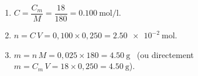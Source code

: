 \documentclass[11pt,a4paper]{article}
\begin{document}
\begin{corrige}
\begin{enumerate}[label=\alph*)]
  \item $C = \dfrac{C_m}{M} = \dfrac{18}{180} = \SI{0.100}{\mole\per\litre}$.
  \item $n = C\,V = 0{,}100\times 0{,}250 = \SI{2.50e-2}{\mole}$.
  \item $m = n\,M = 0{,}025\times 180 = \SI{4.50}{\gram}$ \ (ou directement $m = C_m\,V = 18\times 0{,}250 = \SI{4.50}{\gram}$).
\end{enumerate}
\end{corrige}
\end{document}
